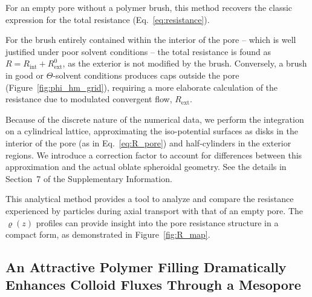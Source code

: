\documentclass[12pt, a4paper]{article}
\begin{document}
For an empty pore without a polymer brush, this method recovers the classic expression for the total resistance (Eq.~\ref{eq:resistance}).

For the brush entirely contained within the interior of the pore -- which is well justified under poor solvent conditions -- the total resistance is found as $R = R_{\text{int}} + R_{\text{ext}}^{0}$, as the exterior is not modified by the brush.
Conversely, a brush in good or $\Theta$-solvent conditions produces caps outside the pore (Figure~\ref{fig:phi_hm_grid}), requiring a more elaborate calculation of the resistance due to modulated convergent flow, $R_{\text{ext}}$.

Because of the discrete nature of the numerical data, we perform the integration on a cylindrical lattice, approximating the iso-potential surfaces as disks in the interior of the pore (as in Eq.~\ref{eq:R_pore}) and half-cylinders in the exterior regions.
We introduce a correction factor to account for differences between this approximation and the actual oblate spheroidal geometry.
See the details in Section~7 of the Supplementary Information.

This analytical method provides a tool to analyze and compare the resistance experienced by particles during axial transport with that of an empty pore.
The $\varrho(z)$ profiles can provide insight into the pore resistance structure in a compact form, as demonstrated in Figure~\ref{fig:R_map}.


\subsection{An Attractive Polymer Filling Dramatically Enhances Colloid Fluxes Through a Mesopore}
\end{document}
